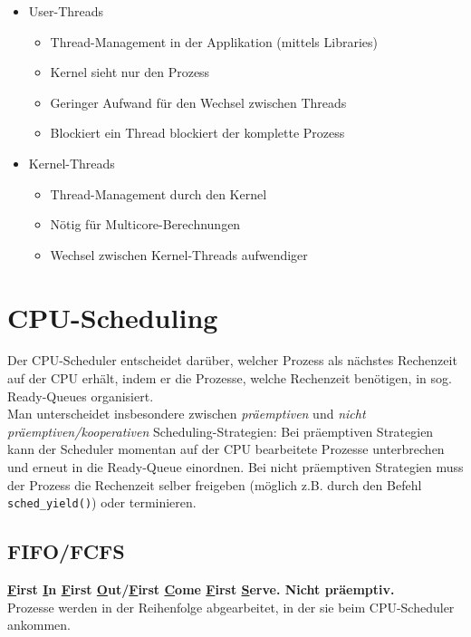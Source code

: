 \documentclass[11pt]{scrartcl}
\begin{document}
\begin{itemize}
  \item{User-Threads}
    \begin{itemize}
    \item{Thread-Management in der Applikation (mittels Libraries)}
    \item{Kernel sieht nur den Prozess}
    \item{Geringer Aufwand für den Wechsel zwischen Threads}
    \item{Blockiert ein Thread blockiert der komplette Prozess}
    \end{itemize}
  \item{Kernel-Threads}
  \begin{itemize}
    \item{Thread-Management durch den Kernel}
    \item{Nötig für Multicore-Berechnungen}
    \item{Wechsel zwischen Kernel-Threads aufwendiger}
  \end{itemize}
\end{itemize}

\section{CPU-Scheduling}
Der CPU-Scheduler entscheidet darüber, welcher Prozess als nächstes Rechenzeit auf der CPU erhält, indem er die Prozesse, welche Rechenzeit benötigen, in sog. Ready-Queues organisiert. \\

Man unterscheidet insbesondere zwischen \textit{präemptiven} und \textit{nicht präemptiven/kooperativen} Scheduling-Strategien: Bei präemptiven Strategien kann der Scheduler momentan auf der CPU bearbeitete Prozesse unterbrechen und erneut in die Ready-Queue einordnen. Bei nicht präemptiven Strategien muss der Prozess die Rechenzeit selber freigeben (möglich z.B. durch den Befehl \texttt{sched\_yield()}) oder terminieren.

\subsection{FIFO/FCFS}
\textbf{\underline First \underline In \underline First \underline Out/\underline First \underline Come \underline First \underline Serve. Nicht präemptiv.}\\

Prozesse werden in der Reihenfolge abgearbeitet, in der sie beim CPU-Scheduler ankommen.\\
\end{document}
